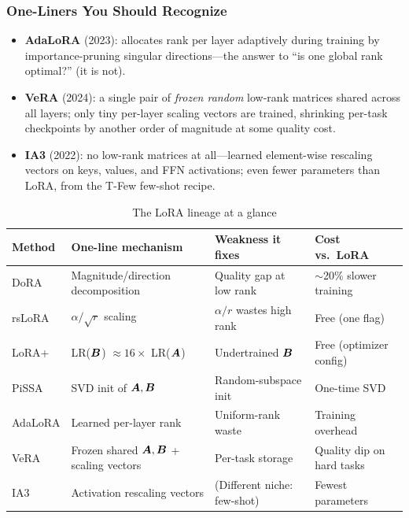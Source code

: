 \subsubsection{One-Liners You Should Recognize}

\begin{itemize}
    \item \textbf{AdaLoRA} (2023): allocates rank per layer adaptively during training by importance-pruning singular directions---the answer to ``is one global rank optimal?'' (it is not).
    \item \textbf{VeRA} (2024): a single pair of \emph{frozen random} low-rank matrices shared across all layers; only tiny per-layer scaling vectors are trained, shrinking per-task checkpoints by another order of magnitude at some quality cost.
    \item \textbf{IA3} (2022): no low-rank matrices at all---learned element-wise rescaling vectors on keys, values, and FFN activations; even fewer parameters than LoRA, from the T-Few few-shot recipe.
\end{itemize}

\begin{table}[H]
\centering
\caption{The LoRA lineage at a glance}
\begin{tabularx}{\textwidth}{lXXl}
\toprule
\textbf{Method} & \textbf{One-line mechanism} & \textbf{Weakness it fixes} & \textbf{Cost vs.\ LoRA} \\
\midrule
DoRA & Magnitude/direction decomposition & Quality gap at low rank & $\sim$20\% slower training \\
rsLoRA & $\alpha/\sqrt{r}$ scaling & $\alpha/r$ wastes high rank & Free (one flag) \\
LoRA+ & LR($\bm{B}$) $\approx 16\times$ LR($\bm{A}$) & Undertrained $\bm{B}$ & Free (optimizer config) \\
PiSSA & SVD init of $\bm{A}, \bm{B}$ & Random-subspace init & One-time SVD \\
AdaLoRA & Learned per-layer rank & Uniform-rank waste & Training overhead \\
VeRA & Frozen shared $\bm{A},\bm{B}$ + scaling vectors & Per-task storage & Quality dip on hard tasks \\
IA3 & Activation rescaling vectors & (Different niche: few-shot) & Fewest parameters \\
\bottomrule
\end{tabularx}
\end{table}

